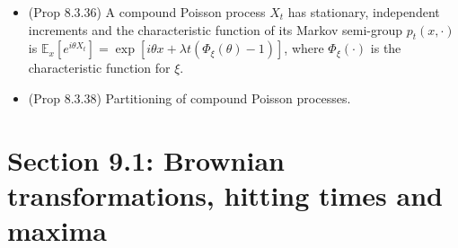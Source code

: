 \documentclass[twoside]{article}
\newcommand\bbE{\mathbb{E}}
\newcommand\lmb{\lambda}
\def\t{\theta}
\begin{document}
\begin{itemize}
\item (Prop 8.3.36) A compound Poisson process $X_t$ has stationary, independent increments and the characteristic function of its Markov semi-group $p_t(x,\cdot)$ is $\bbE_x [e^{i\t X_t}] = \exp \left[i\t x + \lmb t (\Phi_\xi(\t) - 1) \right]$, where $\Phi_\xi(\cdot)$ is the characteristic function for $\xi$.

\item (Prop 8.3.38) Partitioning of compound Poisson processes.

\end{itemize}

\section*{Section 9.1: Brownian transformations, hitting times and maxima}
\end{document}
